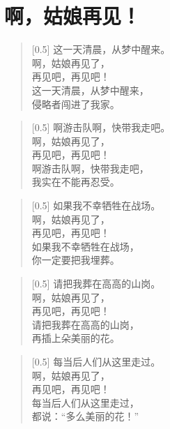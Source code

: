 \documentclass[12pt,UTF-8,openany]{ctexbook}
\begin{document}
\chapter{啊，姑娘再见！}

\begin{large}
    
    \begin{verse}[0.5\linewidth]
        这一天清晨，从梦中醒来。 \\
        啊，姑娘再见了， \\
        再见吧，再见吧！ \\
        这一天清晨，从梦中醒来， \\
        侵略者闯进了我家。
    \end{verse}
    
    
    \begin{verse}[0.5\linewidth]
        啊游击队啊，快带我走吧。 \\
        啊，姑娘再见了， \\
        再见吧，再见吧！ \\
        啊游击队啊，快带我走吧， \\
        我实在不能再忍受。
    \end{verse}
    
    
    \begin{verse}[0.5\linewidth]
        如果我不幸牺牲在战场。 \\
        啊，姑娘再见了， \\
        再见吧，再见吧！ \\
        如果我不幸牺牲在战场， \\
        你一定要把我埋葬。
    \end{verse}
    
    
    \begin{verse}[0.5\linewidth]
        请把我葬在高高的山岗。 \\
        啊，姑娘再见了， \\
        再见吧，再见吧！ \\
        请把我葬在高高的山岗， \\
        再插上朵美丽的花。
    \end{verse}
    
    
    \begin{verse}[0.5\linewidth]
        每当后人们从这里走过。 \\
        啊，姑娘再见了， \\
        再见吧，再见吧！ \\
        每当后人们从这里走过， \\
        都说：“多么美丽的花！”
    \end{verse}
    

\end{large}
\end{document}
